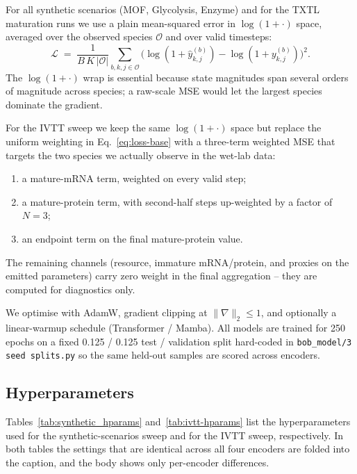 For all synthetic scenarios (MOF, Glycolysis, Enzyme) and for the TXTL
maturation runs we use a plain mean-squared error in $\log(1+\cdot)$ space,
averaged over the observed species $\mathcal{O}$ and over valid timesteps:
\begin{equation}
\mathcal{L}
\;=\;
\frac{1}{B\,K\,|\mathcal{O}|}
\sum_{b,k,j\in\mathcal{O}}
\Big(\log(1+\hat{y}^{(b)}_{k,j}) - \log(1+y^{(b)}_{k,j})\Big)^2 .
\label{eq:loss-base}
\end{equation}
The $\log(1+\cdot)$ wrap is essential because state magnitudes span several
orders of magnitude across species; a raw-scale MSE would let the largest
species dominate the gradient.

For the IVTT sweep we keep the same $\log(1+\cdot)$ space but replace the
uniform weighting in Eq.~\ref{eq:loss-base} with a three-term weighted MSE
that targets the two species we actually observe in the wet-lab data:
\begin{enumerate}
  \item a mature-mRNA term, weighted on every valid step;
  \item a mature-protein term, with second-half steps up-weighted by a
        factor of $N=3$;
  \item an endpoint term on the final mature-protein value.
\end{enumerate}
The remaining channels (resource, immature mRNA/protein, and proxies on
the emitted parameters) carry zero weight in the final aggregation --
they are computed for diagnostics only.

We optimise with AdamW, gradient clipping at $\|\nabla\|_2\!\leq\!1$, and
optionally a linear-warmup schedule (Transformer / Mamba). All models are
trained for 250 epochs on a fixed 0.125 / 0.125 test / validation split
hard-coded in \texttt{bob\_model/3 seed splits.py} so the same held-out
samples are scored across encoders.

\subsection{Hyperparameters}
\label{app:hparams}

Tables~\ref{tab:synthetic_hparams} and~\ref{tab:ivtt-hparams} list the
hyperparameters used for the synthetic-scenarios sweep and for the IVTT
sweep, respectively. In both tables the settings that are identical across
all four encoders are folded into the caption, and the body shows only
per-encoder differences.

